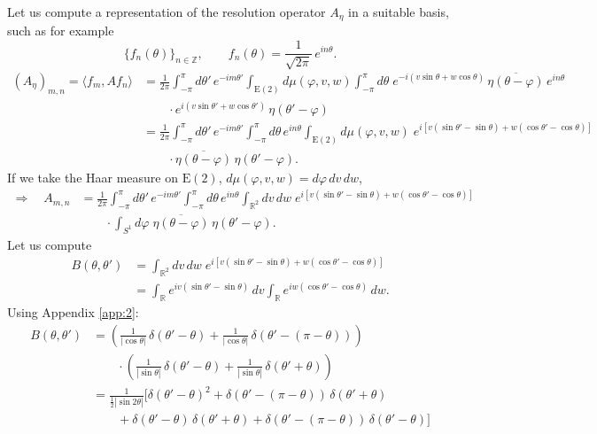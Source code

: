 \documentclass[11pt]{article}
\newcommand{\R}{\mathbb{R}}
\newcommand{\Z}{\mathbb{Z}}
\newcommand{\E}{\mathrm{E}}
\newcommand{\conj}[1]{\overline{#1}}
\begin{document}
Let us compute a representation of the resolution operator $A_\eta$ in a suitable basis, such as for
example
\[
  \{f_n(\theta)\}_{n\in\Z},\qquad f_n(\theta)=\frac{1}{\sqrt{2\pi}}\,e^{in\theta}.
\]
\begin{align*}
  (A_\eta)_{m,n}=\langle f_m,Af_n\rangle
  &=\frac{1}{2\pi}\int_{-\pi}^{\pi}d\theta'\,e^{-im\theta'}
    \int_{\E(2)}d\mu(\varphi,v,w)\int_{-\pi}^{\pi}d\theta\;
    e^{-i(v\sin\theta+w\cos\theta)}\,\conj{\eta(\theta-\varphi)}\,e^{in\theta}\\
  &\qquad\cdot e^{i(v\sin\theta'+w\cos\theta')}\,\eta(\theta'-\varphi)\\
  &=\frac{1}{2\pi}\int_{-\pi}^{\pi}d\theta'\,e^{-im\theta'}
    \int_{-\pi}^{\pi}d\theta\,e^{in\theta}
    \int_{\E(2)}d\mu(\varphi,v,w)\;
    e^{i[v(\sin\theta'-\sin\theta)+w(\cos\theta'-\cos\theta)]}\\
  &\qquad\cdot\conj{\eta(\theta-\varphi)}\,\eta(\theta'-\varphi).
\end{align*}
If we take the Haar measure on $\E(2)$,
$d\mu(\varphi,v,w)=d\varphi\,dv\,dw$,
\begin{align*}
  \Rightarrow\quad A_{m,n}
  &=\frac{1}{2\pi}\int_{-\pi}^{\pi}d\theta'\,e^{-im\theta'}
    \int_{-\pi}^{\pi}d\theta\,e^{in\theta}
    \int_{\R^2}dv\,dw\;
    e^{i[v(\sin\theta'-\sin\theta)+w(\cos\theta'-\cos\theta)]}\\
  &\qquad\cdot\int_{S^1}d\varphi\;\conj{\eta(\theta-\varphi)}\,\eta(\theta'-\varphi).
\end{align*}
Let us compute
\begin{align*}
  B(\theta,\theta')
  &=\int_{\R^2}dv\,dw\;e^{i[v(\sin\theta'-\sin\theta)+w(\cos\theta'-\cos\theta)]}\\
  &=\int_{\R}e^{iv(\sin\theta'-\sin\theta)}\,dv
    \int_{\R}e^{iw(\cos\theta'-\cos\theta)}\,dw.
\end{align*}
Using  Appendix \ref{app:2}:
\begin{align*}
  B(\theta,\theta')
  &=\left(\frac{1}{|\cos\theta|}\,\delta(\theta'-\theta)
         +\frac{1}{|\cos\theta|}\,\delta(\theta'-(\pi-\theta))\right)\\
  &\qquad\cdot\left(\frac{1}{|\sin\theta|}\,\delta(\theta'-\theta)
         +\frac{1}{|\sin\theta|}\,\delta(\theta'+\theta)\right)\\
  &=\frac{1}{\tfrac12|\sin2\theta|}\Big[\delta(\theta'-\theta)^2
     +\delta(\theta'-(\pi-\theta))\,\delta(\theta'+\theta)\\
  &\qquad+\delta(\theta'-\theta)\,\delta(\theta'+\theta)
     +\delta(\theta'-(\pi-\theta))\,\delta(\theta'-\theta)\Big]
\end{align*}
\end{document}
